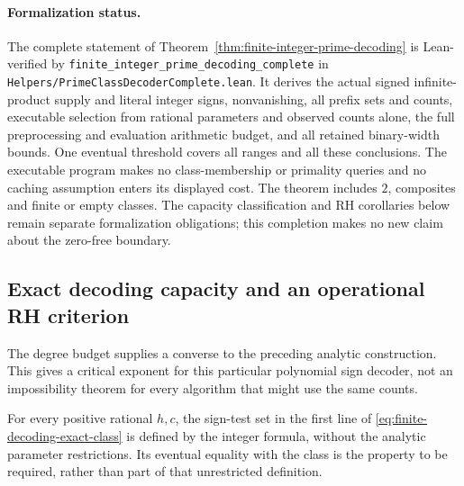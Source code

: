 \documentclass[11pt]{article}
\theoremstyle{definition}
\begin{document}
\paragraph{Formalization status.}
The complete statement of Theorem~\ref{thm:finite-integer-prime-decoding}
is Lean-verified by
\texttt{finite\_\allowbreak integer\_\allowbreak prime\_\allowbreak decoding\_\allowbreak complete}
in \texttt{Helpers/}\allowbreak\texttt{PrimeClassDecoderComplete.lean}.
It derives the actual signed infinite-product supply and literal integer
signs, nonvanishing, all prefix sets and counts, executable selection from
rational parameters and observed counts alone, the full preprocessing
and evaluation arithmetic budget, and all retained binary-width bounds.
One eventual threshold covers all ranges and all these conclusions.
The executable program makes no class-membership or primality queries
and no caching assumption enters its displayed cost.
The theorem includes $2$, composites and finite or empty classes.
The capacity classification and RH corollaries below remain separate
formalization obligations; this completion makes no new claim about
the zero-free boundary.

\subsection{Exact decoding capacity and an operational RH criterion}
\label{sec:prime-decoding-capacity}

The degree budget supplies a converse to the preceding analytic
construction. This gives a critical exponent for this particular
polynomial sign decoder, not an impossibility theorem for every
algorithm that might use the same counts.

For every positive rational $h,c$, the sign-test set in the
first line of \eqref{eq:finite-decoding-exact-class} is defined
by the integer formula, without the analytic parameter
restrictions. Its eventual equality with the class is the
property to be required, rather than part of that unrestricted
definition.
\end{document}
